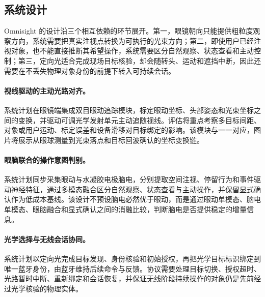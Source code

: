\subsection{系统设计}
Omnisight 的设计沿三个相互依赖的环节展开。第一，眼镜朝向只能提供粗粒度观察方向，系统需要把真实注视点转换为可执行的光束方向；第二，即使用户已经注视对象，也不能直接推断其希望操作，系统需要区分自然观察、状态查看和主动控制；第三，定向光适合完成现场目标核验，却会随转头、运动和遮挡中断，因此还需要在不丢失物理对象身份的前提下转入可持续会话。

\paragraph{视线驱动的主动光路对齐。}
系统计划在眼镜端集成双目眼动追踪模块，标定眼动坐标、头部姿态和光束坐标之间的变换，并驱动可调光学发射单元主动追随视线。评估将重点考察多目标间距、对象或用户运动、标定误差和设备滑移对目标绑定的影响。该模块与一一对应，图片将展示从眼球测量到光束落点和目标回波确认的坐标变换链。


\paragraph{眼脑联合的操作意图判别。}
系统计划同步采集眼动与水凝胶电极脑电，分别提取空间注视、停留行为和事件驱动神经特征，通过多模态融合区分自然观察、状态查看与主动操作，并保留显式确认作为低成本基线。该设计不预设脑电必然优于眼动，而是通过眼动单模态、脑电单模态、眼脑融合和显式确认之间的消融比较，判断脑电是否提供稳定的增量信息。


\paragraph{光学选择与无线会话协同。}
系统计划以定向光完成目标发现、身份核验和初始授权，再把光学目标标识绑定到唯一蓝牙身份，由蓝牙维持后续命令与反馈。协议需要处理目标切换、授权超时、光路暂时中断、重新绑定和会话恢复，并保证无线阶段持续操作的对象仍是先前经过光学核验的物理实体。

